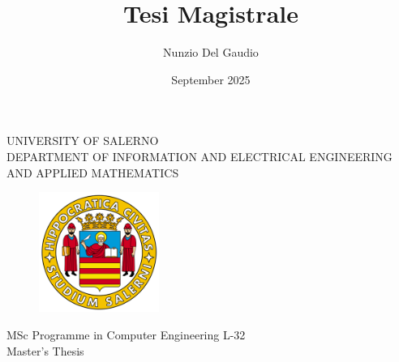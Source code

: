 \documentclass[a4paper, 12pt, oneside]{book}
\title{Tesi Magistrale}
\author{Nunzio Del Gaudio}
\date{September 2025}
\begin{document}
\begin{titlepage}
    \begin{center}
        {\fontsize{22}{36}\selectfont\uppercase{University of Salerno}}\\
        \vspace{8mm}
        \uppercase{\large DEPARTMENT OF INFORMATION AND ELECTRICAL ENGINEERING AND APPLIED MATHEMATICS}\\
    \end{center}
    \begin{figure}[H]
        \centering
        \includegraphics[width=0.35\textwidth]{img/logo_unisa.png}
    \end{figure}
    \vspace{2mm}
    \begin{center}
        \large{MSc Programme in Computer Engineering L-32}\\
        \vspace{7mm}
        \large{Master's Thesis}\\
        \vspace{15mm}
        {\fontsize{22}{10}}\\
        \vspace{4mm}
        {\fontsize{15}{15}\selectfont{\bf Natural Language Processing and Large Language Models }}
    \end{center}

    \vspace{25mm}
    \noindent
    \begin{minipage}[t]{0.47\textwidth}
        {\fontsize{12}{12}\selectfont{ Supervisor:\\\bf Ch.mo Prof. \\Nicola Capuano}}
    \end{minipage}
    \hfill
    \begin{minipage}[t]{0.4\textwidth}\raggedleft
        {\fontsize{12}{12}\selectfont{Author: \\ \bf Nunzio Del Gaudio\\ Student ID. 0622702277}}
    \end{minipage}

    \vspace{20mm}


\end{titlepage}
\end{document}
